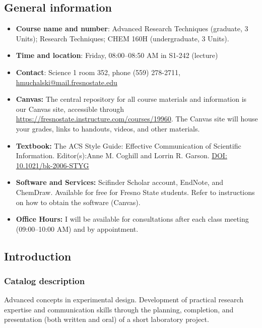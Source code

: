 \hypertarget{general-information}{%
\subsection{General information}\label{general-information}}

\begin{itemize}
\tightlist
\item
  \textbf{Course name and number}: Advanced Research Techniques
  (graduate, 3 Units); Research Techniques; CHEM 160H (undergraduate, 3
  Units).
\item
  \textbf{Time and location}: Friday, 08:00--08:50 AM in S1-242
  (lecture)
\item
  \textbf{Contact}: Science 1 room 352, phone (559) 278-2711,
  \url{hmuchalski@mail.fresnostate.edu}
\item
  \textbf{Canvas:} The central repository for all course materials and
  information is our Canvas site, accessible through
  \url{https://fresnostate.instructure.com/courses/19960}. The Canvas
  site will house your grades, links to handouts, videos, and other
  materials.
\item
  \textbf{Textbook:} The ACS Style Guide: Effective Communication of
  Scientific Information. Editor(s):Anne M. Coghill and Lorrin R.
  Garson.
  \href{http://login.hmlproxy.lib.csufresno.edu/login?url=http://dx.doi.org/10.1021/bk-2006-STYG}{DOI:
  10.1021/bk-2006-STYG}
\item
  \textbf{Software and Services:} Scifinder Scholar account, EndNote,
  and ChemDraw. Available for free for Fresno State students. Refer to
  instructions on how to obtain the software (Canvas).
\item
  \textbf{Office Hours:} I will be available for consultations after
  each class meeting (09:00--10:00 AM) and by appointment.
\end{itemize}

\hypertarget{introduction}{%
\subsection{Introduction}\label{introduction}}

\hypertarget{catalog-description}{%
\subsubsection{Catalog description}\label{catalog-description}}

Advanced concepts in experimental design. Development of practical
research expertise and communication skills through the planning,
completion, and presentation (both written and oral) of a short
laboratory project.

